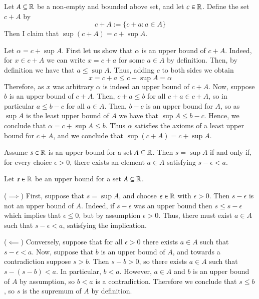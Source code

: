\documentclass[12pt]{report}
\begin{document}
\begin{eg*}{}{}
    Let $A \subseteq \mathbb R$ be a non-empty and bounded above set, and let $c \in \mathbb R$. Define the set $c+A$ by $$c+A:=\{c+a:a \in A\}$$ Then I claim that $\sup(c+A) = c+\sup A$.
    \begin{proof*}{}{}
        Let $\alpha = c+\sup A$. First let us show that $\alpha$ is an upper bound of $c+A$. Indeed, for $x \in c+A$ we can write $x = c+a$ for some $a \in A$ by definition. Then, by definition we have that $a \leq \sup A$. Thus, adding $c$ to both sides we obtain $$x = c+a \leq c+\sup A = \alpha$$
        Therefore, as $x$ was arbitrary $\alpha$ is indeed an upper bound of $c+A$. Now, suppose $b$ is an upper bound of $c+A$. Then, $c+a \leq b$ for all $c+a \in c+ A$, so in particular $a \leq b - c$ for all $a \in A$. Then, $b-c$ is an upper bound for $A$, so as $\sup A$ is the least upper bound of $A$ we have that $\sup A \leq b-c$. Hence, we conclude that $\alpha = c+\sup A \leq b$. Thus $\alpha$ satisfies the axioms of a least upper bound for $c+A$, and we conclude that $\sup(c+A) = c+\sup A$.
    \end{proof*}
\end{eg*}


\begin{lem}{}{}
    Assume $s \in \mathbb R$ is an upper bound for a set $A \subseteq \mathbb R$. Then $s = \sup A$ if and only if, for every choice $\epsilon > 0$, there exists an element $a \in A$ satisfying $s-\epsilon < a$.
\end{lem}
\begin{proof*}{}{}
    Let $s \in \mathbb R$ be an upper bound for a set $A \subseteq \mathbb R$. 

    ($\implies$) First, suppose that $s = \sup A$, and choose $\epsilon \in \mathbb R$ with $\epsilon > 0$. Then $s-\epsilon$ is not an upper bound of $A$. Indeed, if $s-\epsilon$ was an upper bound then $s \leq s - \epsilon$ which implies that $\epsilon \leq 0$, but by assumption $\epsilon > 0$. Thus, there must exist $a \in A$ such that $s - \epsilon < a$, satisfying the implication.

    ($\impliedby$) Conversely, suppose that for all $\epsilon > 0$ there exists $a \in A$ such that $s - \epsilon < a$. Now, suppose that $b$ is an upper bound of $A$, and towards a contradiction suppose $s > b$. Then $s - b > 0$, so there exists $a \in A$ such that $s - (s-b) < a$. In particular, $b < a$. However, $a \in A$ and $b$ is an upper bound of $A$ by assumption, so $b < a$ is a contradiction. Therefore we conclude that $s \leq b$, so $s$ is the supremum of $A$ by definition.
\end{proof*}
\end{document}

